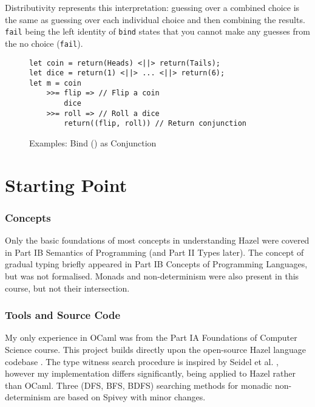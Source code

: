 Distributivity represents this interpretation:  guessing over a combined choice is the same as guessing over each individual choice and then combining the results. \texttt{fail} being the left identity of \texttt{bind} states that you cannot make any guesses from the no choice (\texttt{fail}). 
\begin{figure}[h]\centering
\begin{verbatim}
let coin = return(Heads) <||> return(Tails);
let dice = return(1) <||> ... <||> return(6);
let m = coin 
    >>= flip => // Flip a coin
        dice
    >>= roll => // Roll a dice
        return((flip, roll)) // Return conjunction
\end{verbatim}
\caption{Examples: Bind (\code{>>=}) as Conjunction}
\label{fig:Conjunction}
\end{figure}

\section{Starting Point}\label{sec:StartingPoint}
\subsubsection{Concepts}
Only the basic foundations of most concepts in understanding Hazel were covered in Part IB Semantics of Programming (and Part II Types later). The concept of gradual typing briefly appeared in Part IB Concepts of Programming Languages, but was not formalised. Monads and non-determinism were also present in this course, but not their intersection.

\subsubsection{Tools and Source Code}
My only experience in OCaml was from the Part IA Foundations of Computer Science course. This project builds directly upon the open-source Hazel language codebase \cite{HazelCode}. The type witness search procedure is inspired by Seidel et al. \cite{SearchProc}, however my implementation differs significantly, being applied to Hazel rather than OCaml. Three (DFS, BFS, BDFS) searching methods for monadic non-determinism are based on Spivey \cite{Bunches} with minor changes.

